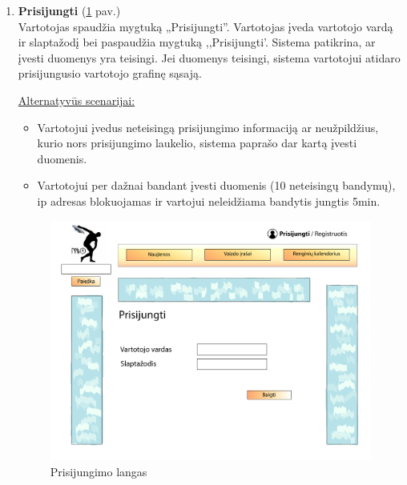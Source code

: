 \documentclass{VUMIFPSkursinis}
\begin{document}
\begin{enumerate} [label = \textbf{U\arabic*.}]
			\item \textbf{Prisijungti} (\ref{fig:uzd_prisijungti} pav.)\\
					Vartotojas spaudžia mygtuką „Prisijungti''. Vartotojas įveda vartotojo vardą ir slaptažodį bei paspaudžia mygtuką ,,Prisijungti'. Sistema patikrina, ar įvesti duomenys yra teisingi. Jei duomenys teisingi, sistema vartotojui atidaro prisijungusio vartotojo grafinę sąsają. 
					
				\underline{Alternatyvūs scenarijai:}
				\begin{itemize}
						\item Vartotojui įvedus neteisingą prisijungimo informaciją ar neužpildžius, kurio nors prisijungimo laukelio, sistema paprašo dar kartą įvesti duomenis.
						\item Vartotojui per dažnai bandant įvesti duomenis (10 neteisingų bandymų), ip adresas blokuojamas ir vartojui neleidžiama bandytis jungtis 5min. 
				\end{itemize}

				\begin{figure}[H]
					\centering
					\includegraphics[width=\textwidth]{img/PSI4/Prisijungimas-01.jpg}
					\caption{Prisijungimo langas}
					\label{fig:uzd_prisijungti}
				\end{figure}
				

\end{enumerate}
\end{document}

